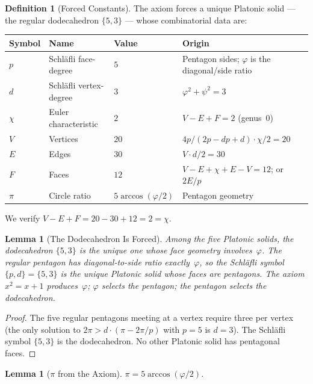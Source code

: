 \documentclass[11pt,a4paper]{article}
\theoremstyle{plain}
\newtheorem{lemma}[theorem]{Lemma}
\theoremstyle{definition}
\newtheorem{definition}[theorem]{Definition}
\newcommand{\vp}{\varphi}
\newcommand{\ps}{\psi}
\begin{document}
\begin{definition}[Forced Constants]\label{def:forced}
The axiom forces a unique Platonic solid --- the regular dodecahedron
$\{5,3\}$ --- whose combinatorial data are:
\begin{center}
\begin{tabular}{@{}llll@{}}
\toprule
Symbol & Name & Value & Origin \\
\midrule
$p$ & Schl\"afli face-degree & $5$ & Pentagon sides; $\vp$ is
  the diagonal/side ratio \\
$d$ & Schl\"afli vertex-degree & $3$ & $\vp^2 + \ps^2 = 3$ \\
$\chi$ & Euler characteristic & $2$ & $V - E + F = 2$ (genus~$0$) \\
$V$ & Vertices & $20$ & $4p/(2p - dp + d) \cdot \chi/2 = 20$ \\
$E$ & Edges & $30$ & $V \cdot d / 2 = 30$ \\
$F$ & Faces & $12$ & $V - E + \chi + E - V = 12$; or $2E/p$ \\
$\pi$ & Circle ratio & $5\arccos(\vp/2)$ & Pentagon geometry \\
\bottomrule
\end{tabular}
\end{center}
We verify $V - E + F = 20 - 30 + 12 = 2 = \chi$.
\end{definition}

\begin{lemma}[The Dodecahedron Is Forced]\label{lem:forced-dodec}
Among the five Platonic solids, the dodecahedron $\{5,3\}$ is the unique
one whose face geometry involves~$\vp$.  The regular pentagon has
diagonal-to-side ratio exactly~$\vp$, so the Schl\"afli symbol $\{p,d\}
= \{5,3\}$ is the unique Platonic solid whose faces are pentagons.
The axiom $x^2 = x + 1$ produces~$\vp$; $\vp$ selects the pentagon;
the pentagon selects the dodecahedron.
\end{lemma}

\begin{proof}
The five regular pentagons meeting at a vertex require three per vertex
(the only solution to $2\pi > d \cdot (\pi - 2\pi/p)$ with $p = 5$
is $d = 3$).  The Schl\"afli symbol $\{5,3\}$ is the dodecahedron.
No other Platonic solid has pentagonal faces.
\end{proof}

\begin{lemma}[$\pi$ from the Axiom]\label{lem:pi}
$\pi = 5\arccos(\vp/2)$.
\end{lemma}
\end{document}
